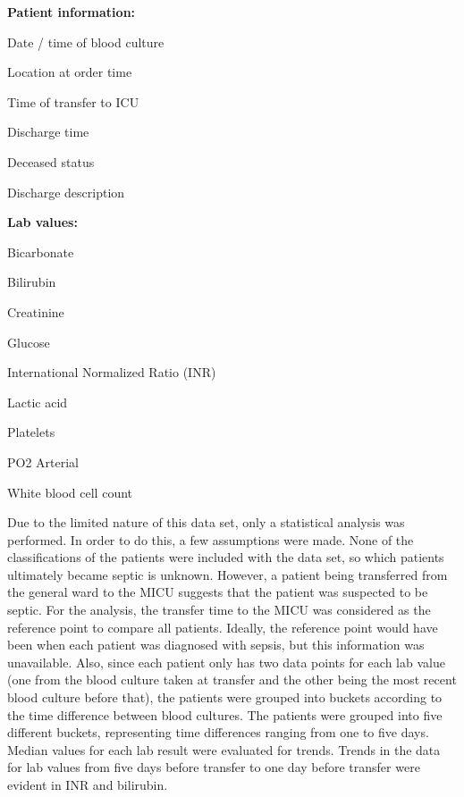 \documentclass{sig-alternate}
\begin{document}
\noindent \textbf{Patient information:}
\begin{itemize*}
  \item Date / time of blood culture
  \item Location at order time
  \item Time of transfer to ICU
  \item Discharge time
  \item Deceased status
  \item Discharge description
\end{itemize*}

\noindent \textbf{Lab values:}
\begin{itemize*}
  \item Bicarbonate
  \item Bilirubin
  \item Creatinine
  \item Glucose
  \item International Normalized Ratio (INR)
  \item Lactic acid
  \item Platelets
  \item PO2 Arterial
  \item White blood cell count
\end{itemize*}

Due to the limited nature of this data set, only a statistical analysis was performed.  In order to do this, a few assumptions were made.  None of the classifications of the patients were included with the data set, so which patients ultimately became septic is unknown.  However, a patient being transferred from the general ward to the MICU suggests that the patient was suspected to be septic.  For the analysis, the transfer time to the MICU was considered as the reference point to compare all patients.  Ideally, the reference point would have been when each patient was diagnosed with sepsis, but this information was unavailable.  Also, since each patient only has two data points for each lab value (one from the blood culture taken at transfer and the other being the most recent blood culture before that), the patients were grouped into buckets according to the time difference between blood cultures.  The patients were grouped into five different buckets, representing time differences ranging from one to five days.  Median values for each lab result were evaluated for trends.  Trends in the data for lab values from five days before transfer to one day before transfer were evident in INR and bilirubin.
\end{document}
